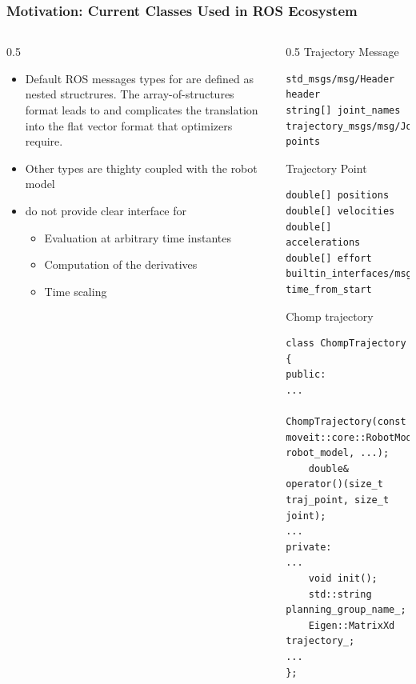 \begin{frame}[fragile]
	\frametitle{Motivation: Current Classes Used in ROS Ecosystem}
	\begin{columns}
		\begin{column}{0.5\textwidth}
			\begin{itemize}
				\item Default ROS messages types for are defined as nested structrures.
				      The array-of-structures format leads to  and complicates the translation into the flat vector format that optimizers require.
				\item Other types are thighty coupled with the robot model
				\item do not provide clear interface for
				      \begin{itemize}
					      \item Evaluation at arbitrary time instantes
					      \item Computation of the derivatives
					      \item Time scaling
				      \end{itemize}
			\end{itemize}

		\end{column}
		\begin{column}{0.5\textwidth}
			Trajectory Message
			\begin{lstlisting}[basicstyle=\fontsize{5pt}{0pt}\selectfont\fontfamily{zi4}\selectfont]
std_msgs/msg/Header header
string[] joint_names
trajectory_msgs/msg/JointTrajectoryPoint[] points
            \end{lstlisting}
			Trajectory Point
			\begin{lstlisting}
double[] positions
double[] velocities
double[] accelerations
double[] effort
builtin_interfaces/msg/Duration time_from_start
                \end{lstlisting}
			Chomp trajectory
			\begin{lstlisting}
class ChompTrajectory
{
public:
...
    ChompTrajectory(const moveit::core::RobotModelConstPtr& robot_model, ...);
    double& operator()(size_t traj_point, size_t joint);
...
private:
...
    void init(); 
    std::string planning_group_name_;  
    Eigen::MatrixXd trajectory_;      
...
};
                \end{lstlisting}
		\end{column}
	\end{columns}
\end{frame}
